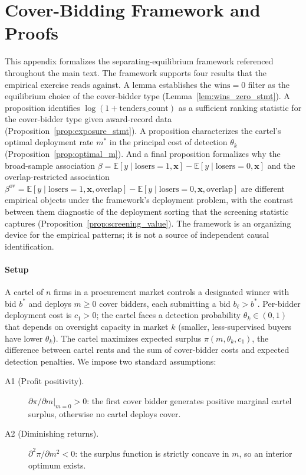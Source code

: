 \section{Cover-Bidding Framework and Proofs}\label{app:proofs}

This appendix formalizes the separating-equilibrium framework
referenced throughout the main text. The framework supports four
results that the empirical exercise reads against. A lemma
establishes the $\text{wins}=0$ filter as the equilibrium choice
of the cover-bidder type (Lemma~\ref{lem:wins_zero_stmt}). A
proposition identifies $\log(1+\text{tenders\_count})$ as a
sufficient ranking statistic for the cover-bidder type given
award-record data (Proposition~\ref{prop:exposure_stmt}). A
proposition characterizes the cartel's optimal deployment rate
$m^{*}$ in the principal cost of detection $\theta_k$
(Proposition~\ref{prop:optimal_m}). And a final proposition
formalizes why the broad-sample association
$\beta=\mathbb{E}[y\mid\text{losers}=1,\mathbf{x}]-\mathbb{E}[y\mid\text{losers}=0,\mathbf{x}]$
and the overlap-restricted association
$\beta^{\text{ov}}=\mathbb{E}[y\mid\text{losers}=1,\mathbf{x},\text{overlap}]-\mathbb{E}[y\mid\text{losers}=0,\mathbf{x},\text{overlap}]$
are different empirical objects under the framework's deployment
problem, with the contrast between them diagnostic of the
deployment sorting that the screening statistic captures
(Proposition~\ref{prop:screening_value}). The framework is an
organizing device for the empirical patterns; it is not a source
of independent causal identification.

\paragraph{Setup}
A cartel of $n$ firms in a procurement market controls a
designated winner with bid $b^*$ and deploys $m \geq 0$ cover
bidders, each submitting a bid $b_\ell > b^*$. Per-bidder
deployment cost is $c_1 > 0$; the cartel faces a detection
probability $\theta_k \in (0,1)$ that depends on oversight
capacity in market $k$ (smaller, less-supervised buyers have
lower $\theta_k$). The cartel maximizes expected surplus
$\pi(m, \theta_k, c_1)$, the difference between cartel rents
and the sum of cover-bidder costs and expected detection
penalties. We impose two standard assumptions:

\begin{description}
\item[A1 (Profit positivity).] $\partial \pi / \partial m \big|_{m=0} > 0$:
the first cover bidder generates positive marginal cartel
surplus, otherwise no cartel deploys cover.
\item[A2 (Diminishing returns).] $\partial^2 \pi / \partial m^2 < 0$:
the surplus function is strictly concave in $m$, so an interior
optimum exists.
\end{description}

